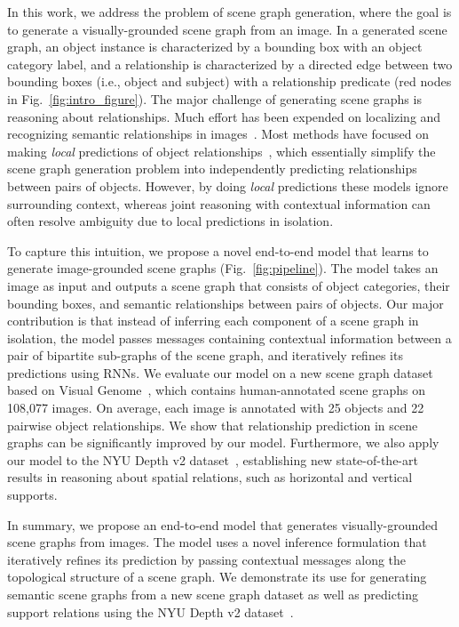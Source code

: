\documentclass[10pt,twocolumn,letterpaper]{article}
\begin{document}
In this work, we address the problem of scene graph generation, where the goal is to generate a visually-grounded scene graph from an image. In a generated scene graph, an object instance is characterized by a bounding box with an object category label, and a relationship is characterized by a directed edge between two bounding boxes (i.e., object and subject) with a relationship predicate (red nodes in Fig.~\ref{fig:intro_figure}).
The major challenge of generating scene graphs is reasoning about relationships. Much effort has been expended on localizing and recognizing semantic relationships in images~\cite{HICO,desai2010discriminative,lu2016visual,sadeghi2011recognition,yao2010modeling}. Most methods have focused on making \emph{local} predictions of object relationships~\cite{lu2016visual,sadeghi2011recognition}, which essentially simplify the scene graph generation problem into independently predicting relationships between pairs of objects. However, by doing \emph{local} predictions these models ignore surrounding context, whereas joint reasoning with contextual information can often resolve ambiguity due to local predictions in isolation.


To capture this intuition, we propose a novel end-to-end model that learns to generate image-grounded scene graphs (Fig.~\ref{fig:pipeline}). The model takes an image as input and outputs a scene graph that consists of object categories, their bounding boxes, and semantic relationships between pairs of objects. Our major contribution is that instead of inferring each component of a scene graph in isolation, the model passes messages containing contextual information between a pair of bipartite sub-graphs of the scene graph, and iteratively refines its predictions using RNNs.
We evaluate our model on a new scene graph dataset based on Visual
Genome~\cite{VG}, which contains human-annotated scene graphs on 108,077 images. On average, each image is annotated with 25 objects and 22 pairwise object relationships. We show that relationship prediction in scene graphs can be significantly improved by our model. Furthermore, we also apply our model to the NYU Depth v2 dataset~\cite{nyudepth}, establishing new state-of-the-art results in reasoning about spatial relations, such as horizontal and vertical supports.

In summary, we propose an end-to-end model that generates visually-grounded scene graphs from images. The model uses a novel inference formulation that iteratively refines its prediction by passing contextual messages along the topological structure of a scene graph. We demonstrate its use for generating semantic scene graphs from a new scene graph dataset as well as predicting support relations using the NYU Depth v2 dataset~\cite{nyudepth}.
\end{document}
